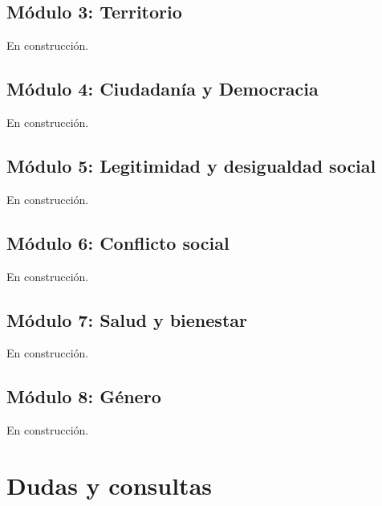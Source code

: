 \documentclass[
  12pt,
]{book}
\begin{document}
\hypertarget{muxf3dulo-3-territorio-1}{%
\section{Módulo 3: Territorio}\label{muxf3dulo-3-territorio-1}}

En construcción.

\hypertarget{muxf3dulo-4-ciudadanuxeda-y-democracia-1}{%
\section{Módulo 4: Ciudadanía y Democracia}\label{muxf3dulo-4-ciudadanuxeda-y-democracia-1}}

En construcción.

\hypertarget{muxf3dulo-5-legitimidad-y-desigualdad-social-1}{%
\section{Módulo 5: Legitimidad y desigualdad social}\label{muxf3dulo-5-legitimidad-y-desigualdad-social-1}}

En construcción.

\hypertarget{muxf3dulo-6-conflicto-social-1}{%
\section{Módulo 6: Conflicto social}\label{muxf3dulo-6-conflicto-social-1}}

En construcción.

\hypertarget{muxf3dulo-7-salud-y-bienestar-1}{%
\section{Módulo 7: Salud y bienestar}\label{muxf3dulo-7-salud-y-bienestar-1}}

En construcción.

\hypertarget{muxf3dulo-8-guxe9nero-1}{%
\section{Módulo 8: Género}\label{muxf3dulo-8-guxe9nero-1}}

En construcción.

\hypertarget{dudas-y-consultas}{%
\chapter{Dudas y consultas}\label{dudas-y-consultas}}
\end{document}
